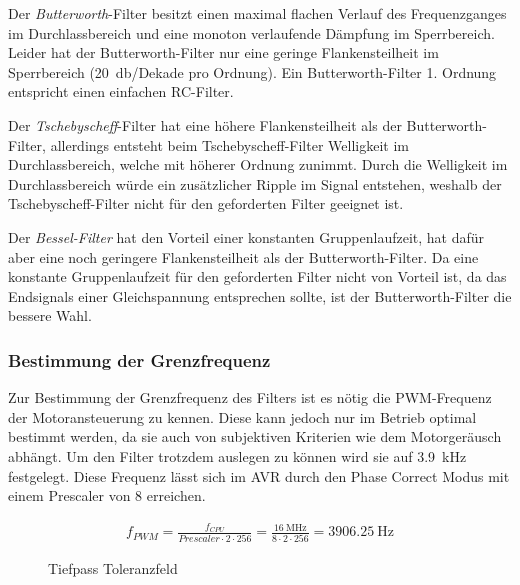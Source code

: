 Der \emph{Butterworth}-Filter besitzt einen maximal flachen Verlauf des Frequenzganges im Durchlassbereich und eine monoton verlaufende Dämpfung im Sperrbereich.
Leider hat der Butterworth-Filter nur eine geringe Flankensteilheit im Sperrbereich (\SI{20}{\decibel}/Dekade pro Ordnung). Ein Butterworth-Filter 1. Ordnung entspricht einen  einfachen RC-Filter.

Der \emph{Tschebyscheff}-Filter hat eine höhere Flankensteilheit als der But\-ter\-worth-Filter, allerdings entsteht beim Tschebyscheff-Filter Welligkeit im Durchlassbereich,
welche mit höherer Ordnung zunimmt. Durch die Welligkeit im Durchlassbereich würde ein zusätzlicher Ripple im Signal entstehen, weshalb der Tschebyscheff-Filter nicht
für den geforderten Filter geeignet ist. 

Der \emph{Bessel-Filter} hat den Vorteil einer konstanten Gruppenlaufzeit, hat dafür aber eine noch geringere Flankensteilheit als der Butterworth-Filter.
Da eine konstante Gruppenlaufzeit für den geforderten Filter nicht von Vorteil ist, da das Endsignals einer Gleichspannung entsprechen sollte, ist der Butterworth-Filter
die bessere Wahl.


\subsubsection{Bestimmung der Grenzfrequenz}

Zur Bestimmung der Grenzfrequenz des Filters ist es nötig die PWM-Frequenz der Motoransteuerung zu kennen. Diese kann jedoch nur im Betrieb optimal bestimmt werden, da sie
auch von subjektiven Kriterien wie dem Motorgeräusch abhängt. Um den Filter trotzdem auslegen zu können wird sie auf \SI{3,9}{\kilo\hertz} festgelegt. Diese Frequenz
lässt sich im AVR durch den Phase Correct Modus mit einem Prescaler von 8 erreichen.

\begin{align*}
f_{PWM}=\frac{f_{CPU}}{Prescaler\cdot 2 \cdot 256} = \frac{\SI{16}{\mega\hertz}}{8 \cdot 2 \cdot 256 }=\SI{3906,25}{\hertz}
\end{align*}


\begin{figure}[H]
\centering
{}
\caption{Tiefpass Toleranzfeld}%
\label{fig:analog}
\end{figure}



